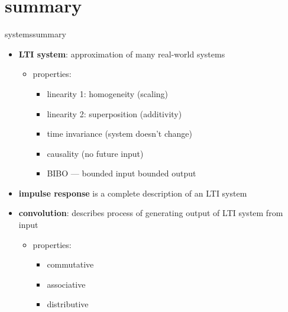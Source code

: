     \section[summary]{summary}
        \begin{frame}{systems}{summary}
            \vspace{-3mm}
            \begin{itemize}
                \item   \textbf{LTI system}: approximation of many real-world systems
                    \begin{itemize}
                    \item<2-> properties:
                        \begin{itemize}
                            \item   linearity 1: homogeneity (scaling)
                            \item   linearity 2: superposition (additivity)
                            \item   time invariance (system doesn't change)
                            \item<3->   causality (no future input)
                            \item<3->   BIBO --- bounded input bounded output
                        \end{itemize}
                    \end{itemize}
                \bigskip
                \item<4-> \textbf{impulse response} is a complete description of an LTI system
                \bigskip
                \item<5-> \textbf{convolution}: describes process of generating output of LTI system from input
                    \begin{itemize}
                    \item<6-> properties:
                        \begin{itemize}
                            \item   commutative
                            \item   associative
                            \item   distributive
                        \end{itemize}
                    \end{itemize}
            \end{itemize}
        \end{frame}

    


